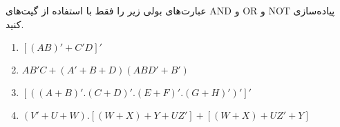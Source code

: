 عبارت‌های بولی زیر را فقط با استفاده از گیت‌های AND و OR و NOT پیاده‌سازی کنید.

\begin{latin}
	\begin{enumerate}
		\item 
		$[(AB)' + C'D]'$
		
		\item 
		$AB'C + (A' + B + D)(ABD' + B')$
		
		\item 
		$[ ((A + B)' . (C + D)' . (E + F)' . (G + H)')']'$
		
		\item 
		$(V' + U + W).[(W + X) + Y + UZ'] + [ (W + X) + UZ' + Y ]$
	\end{enumerate}
\end{latin}

%		
